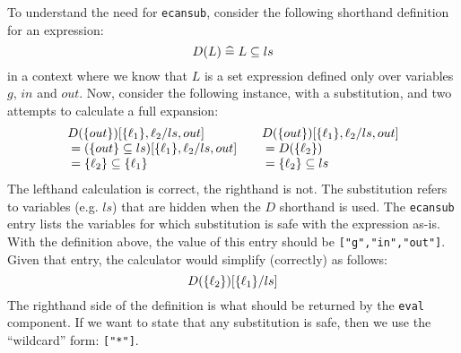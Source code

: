To understand the need for \texttt{ecansub},
consider the following shorthand definition for an expression:
\[
  D(L) \mathrel{\widehat=} L \subseteq ls
\]
in a context where we know that $L$ is a set expression defined
only over variables $g$, $in$ and $out$.
Now, consider the following instance, with a substitution,
and two attempts to calculate a full expansion:
\[\begin{array}{l@{\qquad}l}
   D(\setof{out})[\setof{\ell_1},\ell_2/ls,out]
 & D(\setof{out})[\setof{\ell_1},\ell_2/ls,out]
\\ {} = (\setof{out} \subseteq ls)[\setof{\ell_1},\ell_2/ls,out]
 & {}= D(\setof{\ell_2})
\\ {} = \setof{\ell_2} \subseteq \setof{\ell_1}
 & {} = \setof{\ell_2} \subseteq ls
\end{array}\]
The lefthand calculation is correct, the righthand is not.
The substitution refers to variables (e.g. $ls$)
that are hidden when the $D$ shorthand is used.
The \texttt{ecansub} entry lists the variables for which substitution
is safe with the expression as-is.
With the definition above, the value of this entry
 should be \texttt{["g","in","out"]}.
Given that entry, the calculator would simplify (correctly) as follows:
\[
  D(\{{\ell_2}\})[\{{\ell_1}\}/ls]
\]
The righthand side of the definition is what should be returned
by the \texttt{eval} component.
If we want to state that any substitution is safe,
then we use the ``wildcard'' form: \texttt{["*"]}.


